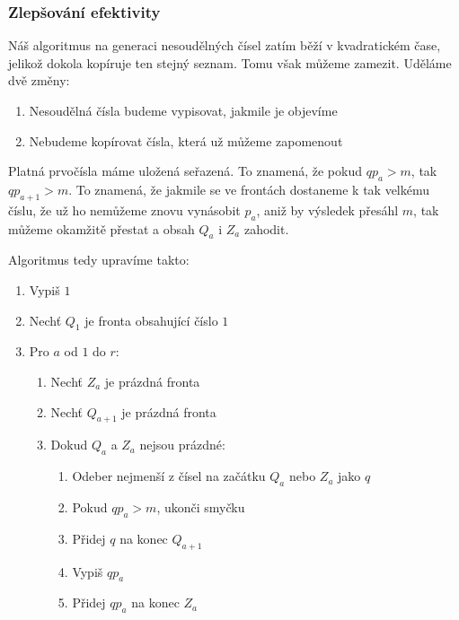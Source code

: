 \documentclass{article}
\begin{document}
\subsubsection{Zlepšování efektivity}

Náš algoritmus na generaci nesoudělných čísel zatím běží v kvadratickém čase, jelikož dokola kopíruje ten stejný seznam. Tomu však můžeme zamezit. Uděláme dvě změny:

\begin{enumerate}
    \item Nesoudělná čísla budeme vypisovat, jakmile je objevíme
    \item Nebudeme kopírovat čísla, která už můžeme zapomenout
\end{enumerate}

Platná prvočísla máme uložená seřazená. To znamená, že pokud $q p_a > m$, tak $q p_{a+1} > m$. To znamená, že jakmile se ve frontách dostaneme k tak velkému číslu, že už ho nemůžeme znovu vynásobit $p_a$, aniž by výsledek přesáhl $m$, tak můžeme okamžitě přestat a obsah $Q_a$ i $Z_a$ zahodit.

Algoritmus tedy upravíme takto:

\begin{enumerate}
    \item Vypiš $1$
    \item Nechť $Q_1$ je fronta obsahující číslo $1$
    \item Pro $a$ od $1$ do $r$:
          \begin{enumerate}[label*=\arabic*.]
              \item Nechť $Z_a$ je prázdná fronta
              \item Nechť $Q_{a+1}$ je prázdná fronta
              \item Dokud $Q_a$ a $Z_a$ nejsou prázdné:
                    \begin{enumerate}[label*=\arabic*.]
                        \item Odeber nejmenší z čísel na začátku $Q_a$ nebo $Z_a$ jako $q$
                        \item Pokud $q p_a > m$, ukonči smyčku
                        \item Přidej $q$ na konec $Q_{a+1}$
                        \item Vypiš $q p_a$
                        \item Přidej $q p_a$ na konec $Z_{a}$
                    \end{enumerate}
          \end{enumerate}
\end{enumerate}
\end{document}

